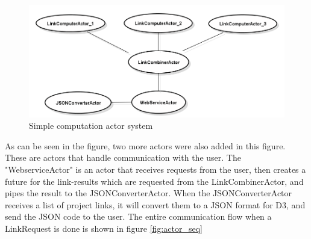 \documentclass[10pt,a4paper]{article}
\begin{document}
\begin{figure}[htb]
    \centering
    \includegraphics[width=1.00\textwidth]{ActorSystemSample}
    \caption{Simple computation actor system}
    \label{fig:actor_sample}
\end{figure}


As can be seen in the figure, two more actors were also added in this figure. These are actors that handle communication with the user. The "WebserviceActor" is an actor that receives requests from the user, then creates a future for the link-results which are requested from the LinkCombinerActor, and pipes the result to the JSONConverterActor. When the JSONConverterActor receives a list of project links, it will convert them to a JSON format for D3, and send the JSON code to the user. The entire communication flow when a LinkRequest is done is shown in figure \ref{fig:actor_seq}


\end{document}
